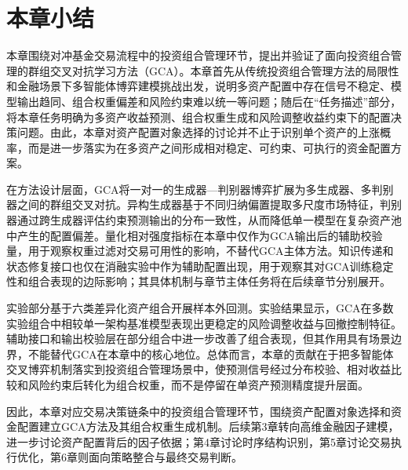


\section{本章小结}

本章围绕对冲基金交易流程中的投资组合管理环节，提出并验证了面向投资组合管理的群组交叉对抗学习方法（GCA）。本章首先从传统投资组合管理方法的局限性和金融场景下多智能体博弈建模挑战出发，说明多资产配置中存在信号不稳定、模型输出趋同、组合权重偏差和风险约束难以统一等问题；随后在“任务描述”部分，将本章任务明确为多资产收益预测、组合权重生成和风险调整收益约束下的配置决策问题。由此，本章对资产配置对象选择的讨论并不止于识别单个资产的上涨概率，而是进一步落实为在多资产之间形成相对稳定、可约束、可执行的资金配置方案。

在方法设计层面，GCA将一对一的生成器—判别器博弈扩展为多生成器、多判别器之间的群组交叉对抗。异构生成器基于不同归纳偏置提取多尺度市场特征，判别器通过跨生成器评估约束预测输出的分布一致性，从而降低单一模型在复杂资产池中产生的配置偏差。量化相对强度指标在本章中仅作为GCA输出后的辅助校验量，用于观察权重过滤对交易可用性的影响，不替代GCA主体方法。知识传递和状态修复接口也仅在消融实验中作为辅助配置出现，用于观察其对GCA训练稳定性和组合表现的边际影响；其具体机制与章节主体任务将在后续章节分别展开。

实验部分基于六类差异化资产组合开展样本外回测。实验结果显示，GCA在多数实验组合中相较单一架构基准模型表现出更稳定的风险调整收益与回撤控制特征。辅助接口和输出校验层在部分组合中进一步改善了组合表现，但其作用具有场景边界，不能替代GCA在本章中的核心地位。总体而言，本章的贡献在于把多智能体交叉博弈机制落实到投资组合管理场景中，使预测信号经过分布校验、相对收益比较和风险约束后转化为组合权重，而不是停留在单资产预测精度提升层面。

因此，本章对应交易决策链条中的投资组合管理环节，围绕资产配置对象选择和资金配置建立GCA方法及其组合权重生成机制。后续第3章转向高维金融因子建模，进一步讨论资产配置背后的因子依据；第4章讨论时序结构识别，第5章讨论交易执行优化，第6章则面向策略整合与最终交易判断。
